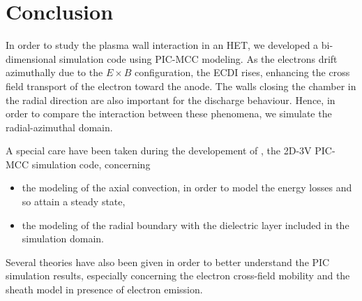 


\section{Conclusion}
  \label{sec-conclusion_ch1}
  

  In order to study the plasma wall interaction in an \ac{HET}, we developed a bi-dimensional simulation code using \ac{PIC}-\ac{MCC} modeling.
  As the electrons drift azimuthally due to the $E \times B$ configuration, the \ac{ECDI} rises, enhancing the cross field transport of the electron toward the anode.
  The walls closing the chamber in the radial direction are also important for the discharge behaviour.
  Hence, in order to compare the interaction between these phenomena, we simulate the radial-azimuthal domain.
  
  A special care have been taken during the developement of \LPPic, the \ac{2D}-\ac{3V} \ac{PIC}-\ac{MCC} simulation code, concerning
  \begin{itemize}
    \item the modeling of the axial convection, in order to model the energy losses and so attain a steady state,
    \item the modeling of the radial boundary with the dielectric layer included in the simulation domain.
  \end{itemize}
  
  Several theories have also been given in order to better understand the \ac{PIC} simulation results, especially concerning the electron cross-field mobility and the sheath model in presence of electron emission.